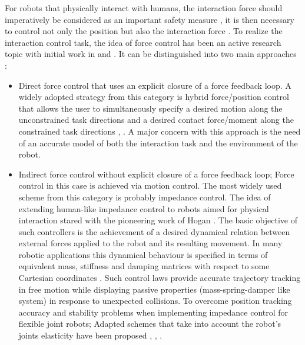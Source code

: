 For robots that physically interact with humans, the interaction force should imperatively be considered as an important safety measure \cite{ISO15066PDF}, it is then necessary to control not only the position but also the interaction force \cite{ikuta2001safety}. To realize the interaction control task, the idea of force control has been an active research topic with initial work in \cite{whitney1977force} and \cite{mason1981compliance}. It can be distinguished into two main approaches \cite{Villani2016force}: 
\begin{itemize}
\item Direct force control that uses an explicit closure of a force feedback loop. A widely adopted strategy from this category is hybrid force/position control that allows the user to simultaneously specify a desired motion along the unconstrained task directions and a desired contact force/moment along the constrained task directions \cite{raibert1981hybrid}, \cite{khatib1987unified}. A major concern with this approach is the need of an accurate model of both the interaction task and the environment of the robot.
\item Indirect force control without explicit closure of a force feedback loop; Force control in this case is achieved via motion control. The most widely used scheme from this category is probably impedance control. The idea of extending human-like impedance control to robots aimed for physical interaction stared with the pioneering work of Hogan \cite{part1985impedance}. The basic objective of such controllers is the achievement of a desired dynamical relation between external forces applied to the robot and its resulting movement. In many robotic  applications this dynamical behaviour is specified in terms  of equivalent mass, stiffness and damping matrices with respect to some Cartesian coordinates \cite{ott2010unified}. Such control laws  provide accurate trajectory tracking in free motion while displaying passive properties (mass-spring-damper like system) in response to unexpected collisions. To overcome position tracking accuracy and stability problems when implementing impedance control for flexible joint robots; Adapted schemes that take into account the robot's joints elasticity have been proposed \cite{albu2007unified} \cite{zollo2005compliance}, \cite{ott2008passivity}, \cite{ott2008cartesian}.   
\end{itemize}
